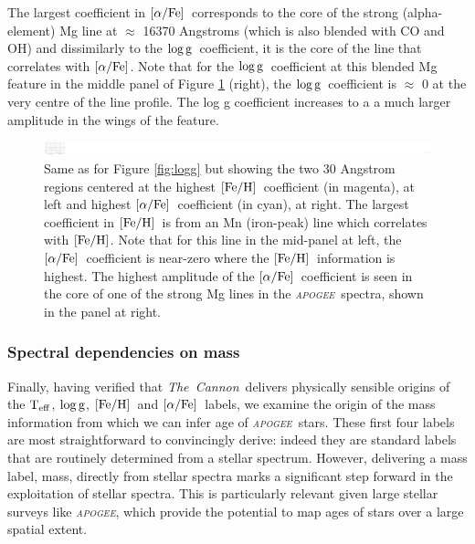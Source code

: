 \documentclass[12pt, preprint]{aastex}
\newcommand{\project}[1]{\textsl{#1}}
\newcommand{\tc}{\project{The~Cannon}}
\newcommand{\apogee}{\project{\textsc{apogee}}}
\newcommand{\teff}{\mbox{$\rm T_{eff}$}}
\newcommand{\feh}{\mbox{$\rm [Fe/H]$}}
\newcommand{\alphafe}{\mbox{$\rm [\alpha/Fe]$}}
\newcommand{\logg}{\mbox{$\rm \log g$}}
\begin{document}
The largest coefficient in \alphafe\ corresponds to the core of the strong (alpha-element) Mg line at $\approx$ 16370 Angstroms (which is also blended with CO and OH) and dissimilarly to the \logg\ coefficient, it is the core of the line that correlates with \alphafe. Note that for the \logg\ coefficient at this blended Mg feature in the middle panel of Figure \ref{fig:feha} (right), the \logg\ coefficient is $\approx$ 0 at the very centre of the line profile. The log g coefficient increases to a a much larger amplitude in the wings of the feature.


\begin{figure}[p]
\centering
    \includegraphics[scale=0.51]{./plots/coeffs_af_3.png}
  \caption{Same as for Figure \ref{fig:logg} but showing the two 30 Angstrom regions centered at the highest \feh\ coefficient (in magenta), at left and highest \alphafe\ coefficient (in cyan), at right. The largest coefficient in \feh\ is from an Mn (iron-peak) line which correlates with \feh. Note that for this line in the mid-panel at left, the \alphafe\ coefficient is near-zero where the \feh\ information is highest. The highest amplitude of the \alphafe\ coefficient is seen in the core of one of the strong Mg lines in the \apogee\ spectra, shown in the panel at right.}
\label{fig:feha}
\end{figure}



\subsubsection{Spectral dependencies on mass} 

Finally, having verified that \tc\ delivers physically sensible origins of the \teff, \logg, \feh\ and \alphafe\ labels, we examine the origin of the mass information from which we can infer age of \apogee\ stars. 
These first four labels are most straightforward  to convincingly derive: indeed they are standard labels that are routinely determined from a stellar spectrum. However, delivering a mass label, mass, directly from stellar spectra marks a significant step forward in the exploitation of stellar spectra. This is particularly relevant given large stellar surveys like \apogee, which provide the potential to map ages of stars over a large spatial extent. 
\end{document}
